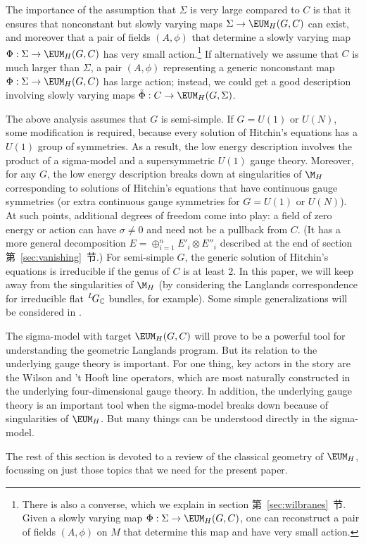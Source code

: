 The importance of the assumption that $\Sigma$ is very large
compared to $C$ is that  it ensures  that nonconstant but slowly
varying maps $\Sigma\to \MH(G,C)$ can exist, and moreover that a
pair of fields $(A,\phi)$ that determine a slowly varying map
$\Phi:\Sigma\to \MH(G,C)$ has very small action.\footnote{There is
also a converse, which we explain in section 第~\ref{sec:wilbranes}~节.  Given a
slowly varying map $\Phi:\Sigma\to \MH(G,C)$, one can reconstruct
a pair of fields $(A,\phi)$ on $M$ that determine this map and
have very small action. } If alternatively we assume that $C$ is
much larger than $\Sigma$, a pair $(A,\phi)$ representing a
generic nonconstant map $\Phi:\Sigma\to \MH(G,C)$ has large
action; instead, we could get a good description involving slowly
varying maps $\tilde\Phi:C\to \MH(G,\Sigma)$.

The above analysis assumes that $G$ is semi-simple. If $G=U(1)$ or
$U(N)$,  some modification is required, because every solution of
Hitchin's equations has a $U(1)$ group of symmetries. As a result,
the low energy description involves the product of a sigma-model
and a supersymmetric $U(1)$ gauge theory. Moreover, for any $G$,
the low energy description breaks down at singularities of $\M_H$
corresponding to solutions of Hitchin's equations that have
continuous gauge symmetries (or extra continuous gauge symmetries
for $G=U(1)$ or $U(N)$). At such points, additional degrees of
freedom come into play: a field of zero energy or action can have
$\sigma\not=0$ and need not be a pullback from $C$.  (It has a
more general decomposition $E=\oplus_{i=1}^nE'_i\otimes E''_i$
described at the end of section 第~\ref{sec:vanishing}~节.)  For semi-simple $G$,
the generic solution of Hitchin's equations is irreducible if the
genus of $C$ is at least 2.  In this paper, we will keep away from
the singularities of $\M_H$ (by considering the Langlands
correspondence for irreducible flat $^L\negthinspace G_{\Bbb{C}}$
bundles, for example).  Some simple generalizations will be
considered in \cite{ref26}.

The sigma-model with target $\MH(G,C)$ will prove to be a powerful
tool for understanding the geometric Langlands program.  But its
relation to the underlying gauge theory is important.  For one
thing, key actors in the story are the  Wilson and 't Hooft line
operators, which are most naturally constructed in the underlying
four-dimensional gauge theory. In addition, the underlying gauge
theory is an important tool when the sigma-model breaks down
because of singularities of $\MH$. But many things can be
understood directly in the sigma-model.

The rest of this section is devoted to a review of the classical
geometry of $\MH$, focussing on just those topics that we need for
the present paper.
